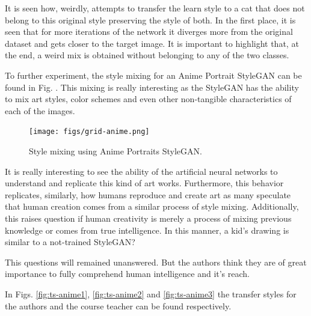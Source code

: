 \documentclass[conference]{IEEEtran}
\theoremstyle{definition}
\theoremstyle{remark}
\theoremstyle{remark}
\begin{document}
It is seen how, weirdly, attempts to transfer the learn style to a cat that does
not belong to this original style preserving the style of both. In the first
place, it is seen that for more iterations of the network it diverges more from
the original dataset and gets closer to the target image. It is important to
highlight that, at the end, a weird mix is obtained without belonging to any of
the two classes.

To further experiment, the style mixing for an Anime Portrait StyleGAN can be
found in Fig. \label{grid-anime}. This mixing is really interesting as the
StyleGAN has the ability to mix art styles, color schemes and even other
non-tangible characteristics of each of the images.

\begin{figure}
  \centering \texttt{[image: figs/grid-anime.png]}
  \caption{Style mixing using Anime Portraits StyleGAN.}
  \label{fig:grid-anime}
\end{figure}

It is really interesting to see the ability of the artificial neural networks to
understand and replicate this kind of art works. Furthermore, this behavior
replicates, similarly, how humans reproduce and create art as many speculate
that human creation comes from a similar process of style mixing. Additionally,
this raises question if human creativity is merely a process of mixing previous
knowledge or comes from true intelligence. In this manner, a kid's drawing is
similar to a not-trained StyleGAN?

This questions will remained unanswered. But the authors think they are of great
importance to fully comprehend human intelligence and it's reach.

In Figs. \ref{fig:ts-anime1}, \ref{fig:ts-anime2} and \ref{fig:ts-anime3} the
transfer styles for the authors and the course teacher can be found
respectively.
\end{document}

